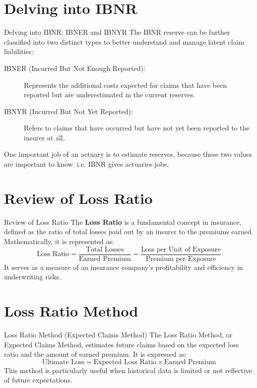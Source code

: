 \documentclass[compress,mathserif]{beamer}
\begin{document}
\section{Delving into IBNR}

\begin{frame}{Delving into IBNR: IBNER and IBNYR}
    The IBNR reserve can be further classified into two distinct types to better understand and manage latent claim liabilities:

    \begin{description}
        \item[IBNER (Incurred But Not Enough Reported):] Represents the additional costs expected for claims that have been reported but are underestimated in the current reserves.
        \item[IBNYR (Incurred But Not Yet Reported):] Refers to claims that have occurred but have not yet been reported to the insurer at all.
    \end{description}
One important job of an actuary is to estimate reserves, because these two values are important to know. i.e. IBNR gives actuaries jobs. 
\end{frame}

\section{Review of Loss Ratio}

\begin{frame}{Review of Loss Ratio}
    The \textbf{Loss Ratio} is a fundamental concept in insurance, defined as the ratio of total losses paid out by an insurer to the premiums earned. Mathematically, it is represented as:
    \[ \text{Loss Ratio} = \frac{\text{Total Losses}}{\text{Earned Premium}} = \frac{\text{Loss per Unit of Exposure}}{\text{Premium per Exposure}} \]
    It serves as a measure of an insurance company's profitability and efficiency in underwriting risks.
\end{frame}

\section{Loss Ratio Method}

\begin{frame}{Loss Ratio Method (Expected Claims Method)}
    The Loss Ratio Method, or Expected Claims Method, estimates future claims based on the expected loss ratio and the amount of earned premium. It is expressed as:
    \[ \text{Ultimate Loss} = \text{Expected Loss Ratio} \times \text{Earned Premium} \]
    This method is particularly useful when historical data is limited or not reflective of future expectations.
\end{frame}
\end{document}
